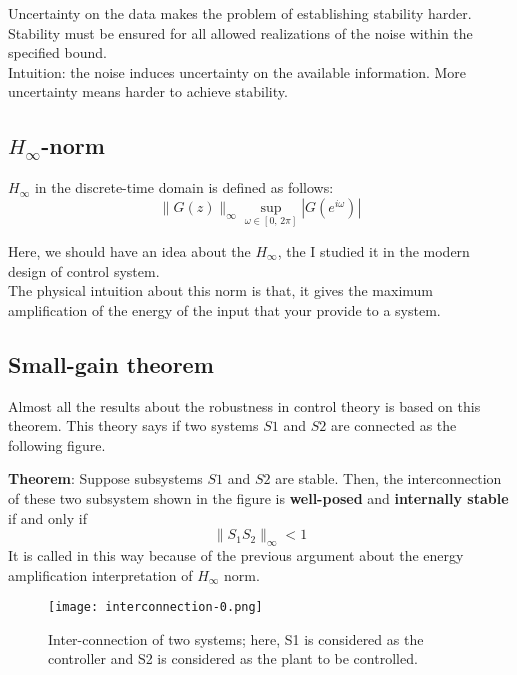 Uncertainty on the data makes the problem of establishing stability harder. Stability must be ensured for all allowed realizations of the noise within the specified
bound.\\

Intuition: the noise induces uncertainty on the available information.
More uncertainty means harder to achieve stability.

\subsection{$H_\infty$-norm}
$H_\infty$ in the discrete-time domain is defined as follows:
\[
\|G(z)\|_\infty  \sup\limits_{\omega \in [0,\,2\pi]} |G(e^{i\omega})|
\]
\begin{factbox}
Here, we should have an idea about the $H_\infty$, the I studied it in the modern design of control system.\\

The physical intuition about this norm is that, it gives the maximum amplification of the energy of the input that your provide to a system.
\end{factbox}

\subsection{Small-gain theorem}
Almost all the results about the robustness in control theory is based on this theorem. This theory says if two systems $S1$ and $S2$ are connected as the following figure. 

\textbf{Theorem}: Suppose subsystems $S1$ and $S2$ are stable. Then, the interconnection of these two subsystem shown in the figure is \textbf{well-posed} and \textbf{internally stable} if and only if 
\[
\|S_1S_2\|_\infty < 1
\]
It is called in this way because of the previous argument about the energy amplification interpretation of $H_\infty$ norm. 
 \begin{figure}[H]
    \centering
    \texttt{[image: interconnection-0.png]}
    \caption{Inter-connection of two systems; here, S1 is considered as the controller and S2 is considered as the plant to be controlled.}
 \end{figure}


